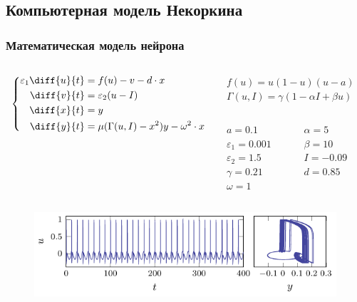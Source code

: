 \subsection{Компьютерная модель Некоркина}
\begin{frame}%
	\frametitle{Математическая модель нейрона}

	
	\begin{columns}[b]
		\begin{column}{0.60\textwidth}
			\begin{equation*}
				\left\{
				\begin{aligned}
					\varepsilon_1\diff{u}{t} & =f(u)-v-d\cdot x\\
					\diff{v}{t} & =\varepsilon_2(u-I)\\
					\diff{x}{t} & =y\\
					\diff{y}{t} & =\mu(\Gamma(u,I)-x^2)y-\omega^2\cdot x
				\end{aligned}
				\right.
			\end{equation*}
		\end{column}
		\begin{column}{0.40\textwidth}
			$f(u)=u(1-u)(u-a)$\\
			\vspace{0.7em}
			$\Gamma(u,I)=\gamma(1-\alpha I +\beta u)$\\
			\vspace{0.7em}
			\begin{columns}[t]
			\begin{column}{0.49\textwidth}
				$a=0.1$\\
				$\varepsilon_1=0.001$\\
				$\varepsilon_2=1.5$\\
				$\gamma=0.21$\\
				$\omega=1$\\
			\end{column}
			\begin{column}{0.49\textwidth}
				$\alpha=5$\\
				$\beta=10$\\
				$I=-0.09$\\
				$d=0.85$\\
			\end{column}			
			\end{columns}
		\end{column}
	\end{columns}
	\begin{figure}[h]
		\includegraphics[scale=1]{img/limit}
	\end{figure}
\end{frame}

